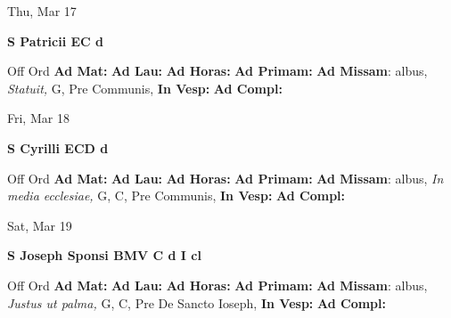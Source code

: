 \documentclass[10pt]{memoir}
\begin{document}
\begin{center}
\begin{minipage}{3.5in}
\vspace{2em}
\begin{center}Thu, Mar 17
\end{center}
\textbf{ \large S Patricii EC
\textnormal{\normalsize d}}

\begin{justify}Off Ord
\textbf{Ad Mat: }
\textbf{Ad Lau: }
\textbf{Ad Horas: }
\textbf{Ad Primam: }\textbf{Ad Missam}: albus, \textit{Statuit,} G, Pre Communis, 
\textbf{In Vesp: }
\textbf{Ad Compl: }
\end{justify}
\end{minipage}
\end{center}

\begin{center}
\begin{minipage}{3.5in}
\vspace{2em}
\begin{center}Fri, Mar 18
\end{center}
\textbf{ \large S Cyrilli ECD
\textnormal{\normalsize d}}

\begin{justify}Off Ord
\textbf{Ad Mat: }
\textbf{Ad Lau: }
\textbf{Ad Horas: }
\textbf{Ad Primam: }\textbf{Ad Missam}: albus, \textit{In media ecclesiae,} G, C, Pre Communis, 
\textbf{In Vesp: }
\textbf{Ad Compl: }
\end{justify}
\end{minipage}
\end{center}

\begin{center}
\begin{minipage}{3.5in}
\vspace{2em}
\begin{center}Sat, Mar 19
\end{center}
\textbf{ \large S Joseph Sponsi BMV C
\textnormal{\normalsize d I cl}}

\begin{justify}Off Ord
\textbf{Ad Mat: }
\textbf{Ad Lau: }
\textbf{Ad Horas: }
\textbf{Ad Primam: }\textbf{Ad Missam}: albus, \textit{Justus ut palma,} G, C, Pre De Sancto Ioseph, 
\textbf{In Vesp: }
\textbf{Ad Compl: }
\end{justify}
\end{minipage}
\end{center}
\end{document}
